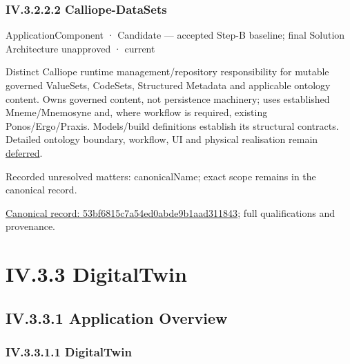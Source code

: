 \subsubsection*{IV.3.2.2.2 Calliope-DataSets}
\label{navigation:IV.3.2.2.2}

\label{element:53bf6815c7a54ed0abde9b1aad311843}
{\small ApplicationComponent · Candidate — accepted Step-B baseline; final Solution Architecture unapproved · current}\par

Distinct Calliope runtime management/repository responsibility for mutable governed
ValueSets, CodeSets, Structured Metadata and applicable ontology content. Owns
governed content, not persistence machinery; uses established Mneme/Mnemosyne and,
where workflow is required, existing Ponos/Ergo/Praxis. Models/build definitions
establish its structural contracts. Detailed ontology boundary, workflow, UI and
physical realisation remain \hyperref[element:466ad8f75a954c0581b5bba090443849]{deferred}.


{\small Recorded unresolved matters: canonicalName; exact scope remains in the canonical record.}\par
{\footnotesize \href{../../../../continuum/application/application-component/53bf6815c7a54ed0abde9b1aad311843.md}{Canonical record: 53bf6815c7a54ed0abde9b1aad311843}; full qualifications and provenance.}\par
\section*{IV.3.3 DigitalTwin}
\label{navigation:IV.3.3}

\subsection*{IV.3.3.1 Application Overview}
\label{navigation:IV.3.3.1}

\subsubsection*{IV.3.3.1.1 DigitalTwin}
\label{navigation:IV.3.3.1.1}

